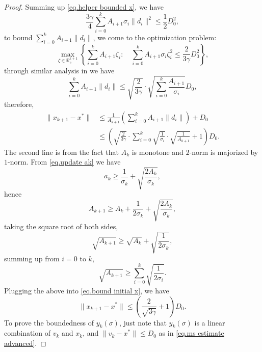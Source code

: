 \documentclass{article}
\begin{document}
\begin{proof}
    Summing up \eqref{eq.helper bounded x}, we have
    \begin{equation*}
        \frac{3\gamma}{4}\sum_{i=0}^k A_{i+1}\sigma_i \|d_i\|^2 \leq \frac{1}{2}D_0^2,
    \end{equation*}
    to bound $\sum_{i=0}^k A_{i+1}\|d_i\|$, we come to the optimization problem:
    \begin{equation*}
        \max _{\zeta \in \mathbb{R}^{k+1}_+}\left\{\sum_{i=0}^{k} A_{i+1}\zeta_i: \quad \sum_{i=0}^{k} A_{i+1} \sigma_i\zeta_i^2 \leq \frac{2}{3\gamma}D_0^2\right\},
    \end{equation*}
    through similar analysis in \citet[Lemma A.2]{monteiro2013accelerated} we have
    \begin{equation*}
        \sum_{i=0}^k A_{i+1}\|d_i\| \leq \sqrt{\frac{2}{3\gamma}}\cdot \sqrt{\sum_{i=0}^k \frac{A_{i+1}}{\sigma_i}} D_0,
    \end{equation*}
    therefore,
    \begin{equation}\label{eq.bound initial x}
        \begin{aligned}
             \|x_{k+1}-x^*\| &\leq \frac{1}{A_{k+1}}\left (\sum_{i=0}^k A_{i+1}\|d_i\|\right)+D_0\\
             &\leq \left(\sqrt{\frac{2}{3\gamma}}\cdot \sum_{i=0}^k\sqrt{\frac{1}{\sigma_i}}\cdot \sqrt{\frac{1}{A_{k+1}}} +1\right)D_0.
        \end{aligned}
    \end{equation}
    The second line is from the fact that $A_k$ is monotone and $2$-norm is majorized by $1$-norm. From \eqref{eq.update ak} we have
    \begin{equation*}
        a_k \geq \frac{1}{\sigma_k}+\sqrt{\frac{2A_k}{\sigma_k}},
    \end{equation*}
    hence
    \begin{equation*}
        A_{k+1}\geq A_k+\frac{1}{2\sigma_k}+\sqrt{\frac{2A_k}{\sigma_k}},
    \end{equation*}
    taking the square root of both sides,
    \begin{equation*}
        \sqrt{A_{k+1}}\geq \sqrt{A_k}+\sqrt{\frac{1}{2\sigma_k}},
    \end{equation*}
    summing up from $i=0$ to $k$,
    \begin{equation*}
        \sqrt{A_{k+1}}\geq \sum_{i=0}^k \sqrt{\frac{1}{2\sigma_i}}.
    \end{equation*}
    Plugging the above into \eqref{eq.bound initial x}, we have
    \begin{equation*}
        \|x_{k+1}-x^*\| \leq \left( \frac{2}{\sqrt{3\gamma}}+1\right) D_0.
    \end{equation*}
    To prove the boundedness of $y_k(\sigma)$, just note that $y_k(\sigma)$ is a linear combination of $v_k$ and $x_k$, and $\|v_k-x^*\| \leq D_0$ as in \eqref{eq.ms estimate advanced}.
\end{proof}
\end{document}

